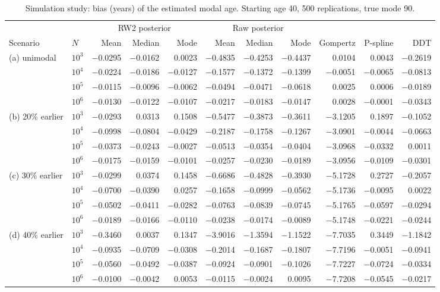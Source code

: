 \begin{table}[htb!]
\centering
\caption{Simulation study: bias (years) of the estimated modal age. Starting age 40, 500 replications, true mode 90.}
\label{tab:app_bias}
\scriptsize
\setlength{\tabcolsep}{4pt}
\begin{tabular}{llrrrrrrrrr}
\hline
 & & \multicolumn{3}{c}{RW2 posterior} & \multicolumn{3}{c}{Raw posterior} & & & \\
Scenario & $N$ & Mean & Median & Mode & Mean & Median & Mode & Gompertz & P-spline & DDT \\
\hline
(a) unimodal & $10^3$ & $-$0.0295 & $-$0.0162 & 0.0023 & $-$0.4835 & $-$0.4253 & $-$0.4437 & 0.0104 & 0.0043 & $-$0.2619 \\
 & $10^4$ & $-$0.0224 & $-$0.0186 & $-$0.0127 & $-$0.1577 & $-$0.1372 & $-$0.1399 & $-$0.0051 & $-$0.0065 & $-$0.0813 \\
 & $10^5$ & $-$0.0115 & $-$0.0096 & $-$0.0062 & $-$0.0494 & $-$0.0471 & $-$0.0618 & 0.0025 & 0.0006 & $-$0.0189 \\
 & $10^6$ & $-$0.0130 & $-$0.0122 & $-$0.0107 & $-$0.0217 & $-$0.0183 & $-$0.0147 & 0.0028 & $-$0.0001 & $-$0.0343 \\[2pt]
(b) 20\% earlier & $10^3$ & $-$0.0293 & 0.0313 & 0.1508 & $-$0.5477 & $-$0.3873 & $-$0.3611 & $-$3.1205 & 0.1897 & $-$0.1052 \\
 & $10^4$ & $-$0.0998 & $-$0.0804 & $-$0.0429 & $-$0.2187 & $-$0.1758 & $-$0.1267 & $-$3.0901 & $-$0.0044 & $-$0.0663 \\
 & $10^5$ & $-$0.0373 & $-$0.0243 & $-$0.0027 & $-$0.0513 & $-$0.0354 & $-$0.0404 & $-$3.0968 & $-$0.0332 & 0.0011 \\
 & $10^6$ & $-$0.0175 & $-$0.0159 & $-$0.0101 & $-$0.0257 & $-$0.0230 & $-$0.0189 & $-$3.0956 & $-$0.0109 & $-$0.0301 \\[2pt]
(c) 30\% earlier & $10^3$ & $-$0.0299 & 0.0374 & 0.1458 & $-$0.6686 & $-$0.4828 & $-$0.3930 & $-$5.1728 & 0.2727 & $-$0.2057 \\
 & $10^4$ & $-$0.0700 & $-$0.0390 & 0.0257 & $-$0.1658 & $-$0.0999 & $-$0.0562 & $-$5.1736 & $-$0.0095 & 0.0022 \\
 & $10^5$ & $-$0.0502 & $-$0.0411 & $-$0.0282 & $-$0.0763 & $-$0.0839 & $-$0.0745 & $-$5.1765 & $-$0.0597 & $-$0.0294 \\
 & $10^6$ & $-$0.0189 & $-$0.0166 & $-$0.0110 & $-$0.0238 & $-$0.0174 & $-$0.0089 & $-$5.1748 & $-$0.0221 & $-$0.0244 \\[2pt]
(d) 40\% earlier & $10^3$ & $-$0.3460 & 0.0037 & 0.1347 & $-$3.9016 & $-$1.3594 & $-$1.1522 & $-$7.7035 & 0.3449 & $-$1.1842 \\
 & $10^4$ & $-$0.0935 & $-$0.0709 & $-$0.0308 & $-$0.2014 & $-$0.1687 & $-$0.1807 & $-$7.7196 & $-$0.0051 & $-$0.0941 \\
 & $10^5$ & $-$0.0560 & $-$0.0492 & $-$0.0387 & $-$0.0924 & $-$0.0901 & $-$0.1026 & $-$7.7227 & $-$0.0724 & $-$0.0334 \\
 & $10^6$ & $-$0.0100 & $-$0.0042 & 0.0053 & $-$0.0115 & $-$0.0024 & 0.0095 & $-$7.7208 & $-$0.0545 & $-$0.0217 \\
\hline
\end{tabular}
\end{table}
